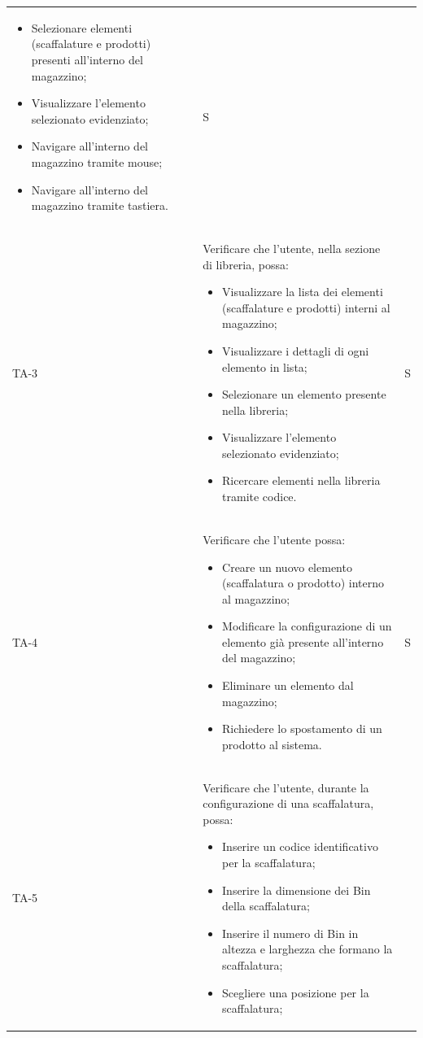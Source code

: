 \begin{xltabular}{0.9\textwidth}{X | p{0.7\textwidth} | X}
\begin{itemize}
\begin{itemize}
        \end{itemize}
        \item Selezionare elementi (scaffalature e prodotti) presenti all'interno del magazzino;
        \item Visualizzare l'elemento selezionato evidenziato;
        \item Navigare all'interno del magazzino tramite mouse;
        \item Navigare all'interno del magazzino tramite tastiera.
    \end{itemize}
    & S\\
    TA-3 & Verificare che l'utente, nella sezione di libreria, possa:
    \begin{itemize}
        \item Visualizzare la lista dei elementi (scaffalature e prodotti) interni al magazzino;
        \item Visualizzare i dettagli di ogni elemento in lista;
        \item Selezionare un elemento presente nella libreria;
        \item Visualizzare l'elemento selezionato evidenziato;
        \item Ricercare elementi nella libreria tramite codice.
    \end{itemize}
    & S \\
    TA-4 & Verificare che l'utente possa:
    \begin{itemize}
        \item Creare un nuovo elemento (scaffalatura o prodotto) interno al magazzino;
        \item Modificare la configurazione di un elemento già presente all'interno del magazzino;
        \item Eliminare un elemento dal magazzino;
        \item Richiedere lo spostamento di un prodotto al sistema.
    \end{itemize} 
    & S \\
    TA-5 & Verificare che l'utente, durante la configurazione di una scaffalatura, possa:
    \begin{itemize}
        \item Inserire un codice identificativo per la scaffalatura;
        \item Inserire la dimensione dei Bin della scaffalatura;
        \item Inserire il numero di Bin in altezza e larghezza che formano la scaffalatura;
        \item Scegliere una posizione per la scaffalatura;

\end{itemize}
\end{xltabular}
